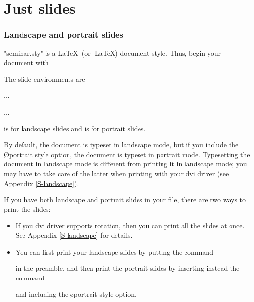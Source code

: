 \twosideclearpage


\part{Just slides}

\section{Landscape and portrait slides}

"seminar.sty" is a \LaTeX\ (or \AmS-\LaTeX) document style. Thus, begin your
document with
\begin{LVerbatim}
\end{LVerbatim}

The slide environments are%
\begin{LVerbatim}
  \begin{slide}    ...    \end{slide}
  \begin{slide*}   ...    \end{slide*}
\end{LVerbatim}
 is for landscape slides and  is for portrait slides.

By default, the document is typeset in landscape mode, but if you include the
\O{portrait} style option, the document is typeset in portrait mode.
Typesetting the document in landscape mode is different from printing it in
landscape mode; you may have to take care of the latter when printing with
your dvi driver (see Appendix \ref{S-landscape}).

If you have both landscape and portrait slides in your file, there are two
ways to print the slides:
\begin{itemize}
  \item If you dvi driver supports rotation, then you can print all the slides
at once. See Appendix \ref{S-landscape} for details.
  \item You can first print your landscape slides by putting the command
\begin{MD}
  \landscapeonly
\end{MD}
in the preamble, and then print the portrait slides by inserting instead the
command
\begin{MD}
  \portraitonly
\end{MD}
and including the \o{portrait} style option.
\end{itemize}

